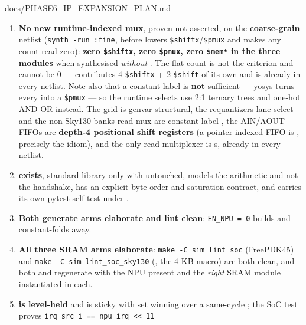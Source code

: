 \begin{relocated}{docs/PHASE6_IP_EXPANSION_PLAN.md}
\begin{enumerate}
\def\labelenumi{\arabic{enumi}.}
\tightlist
\item
  \textbf{No new runtime-indexed mux}, proven not asserted, on the
  \textbf{coarse-grain} netlist
  (\texttt{synth\ -\allowbreak{}run\ :\allowbreak{}fine}, before
   lowers \texttt{\$shiftx}/\texttt{\$pmux} and makes any
  count read zero): \textbf{zero \texttt{\$shiftx}, zero
  \texttt{\$pmux}, zero \texttt{\$mem*} in the three 
  modules} when synthesised \emph{without} . The flat
  count is not the criterion and cannot be 0 ---
   contributes 4 \texttt{\$shiftx} + 2
  \texttt{\$shift} of its own and is already in every netlist. Note also
  that a constant-label  is \textbf{not} sufficient --- yosys
   turns every  into a \texttt{\$pmux} --- so the
  runtime selects use 2:1 ternary trees and one-hot AND-OR instead. The
  grid is genvar structural, the requantizer\textquotesingle s lane
  select and the non-Sky130 banks\textquotesingle{} read mux are
  constant-label , the AIN/AOUT FIFOs are \textbf{depth-4
  positional shift registers} (a pointer-indexed FIFO is
  , precisely the  idiom), and the
  only read multiplexer is \textquotesingle s,
  already in every netlist.
\item
  \textbf{ exists}, standard-library only
  with  untouched, models the arithmetic and not
  the handshake, has an explicit byte-order and saturation contract, and
  carries its own pytest self-test under .
\item
  \textbf{Both generate arms elaborate and lint clean}:
  \texttt{EN\_\allowbreak{}NPU\ =\allowbreak{}\ 0} builds and
  constant-folds away.
\item
  \textbf{All three SRAM arms elaborate}:
  \texttt{make\ -\allowbreak{}C\ sim\ lint\_\allowbreak{}soc}
  (FreePDK45) and
  \texttt{make\ -\allowbreak{}C\ sim\ lint\_\allowbreak{}soc\_\allowbreak{}sky130}
  (, the 4 KB macro) are both clean, and both
   and  regenerate with the
  NPU present and the \emph{right} SRAM module instantiated in each.
\item
  \textbf{ is level-held} and  is sticky
  with set winning over a same-cycle ; the SoC test proves
  \texttt{irq\_\allowbreak{}src\_\allowbreak{}i\ =\allowbreak{}=\allowbreak{}\ npu\_\allowbreak{}irq\ <<\ 11}

\end{enumerate}
\end{relocated}
